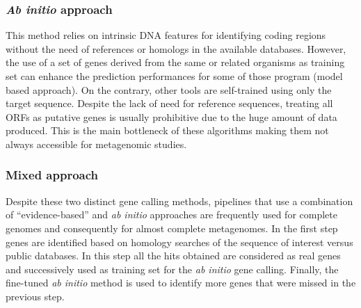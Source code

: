 \subsubsection*{\textit{Ab initio} approach}
This method relies on intrinsic DNA features for identifying coding regions without the need of references or homologs in the available databases. However, the use of a set of genes derived from the same or related organisms as training set can enhance the prediction performances for some of those program (model based approach). On the contrary, other  tools are self-trained using only the target sequence. Despite the lack of need for reference sequences, treating all ORFs as putative genes is usually prohibitive due to the huge amount of data produced. This is the main bottleneck of these algorithms making them not always accessible for metagenomic studies.\\

\subsubsection*{Mixed approach}
Despite these two distinct gene calling methods, pipelines that use a combination of ``evidence-based'' and \textit{ab initio} approaches are frequently used for complete genomes and consequently for almost complete metagenomes. In the first step genes are identified based on homology searches of the sequence of interest versus public databases. In this step all the hits obtained are considered as real genes and successively used as training set for the \textit{ab initio} gene calling. Finally, the fine-tuned \textit{ab initio} method is used to identify more genes that were missed in the previous step.\\

